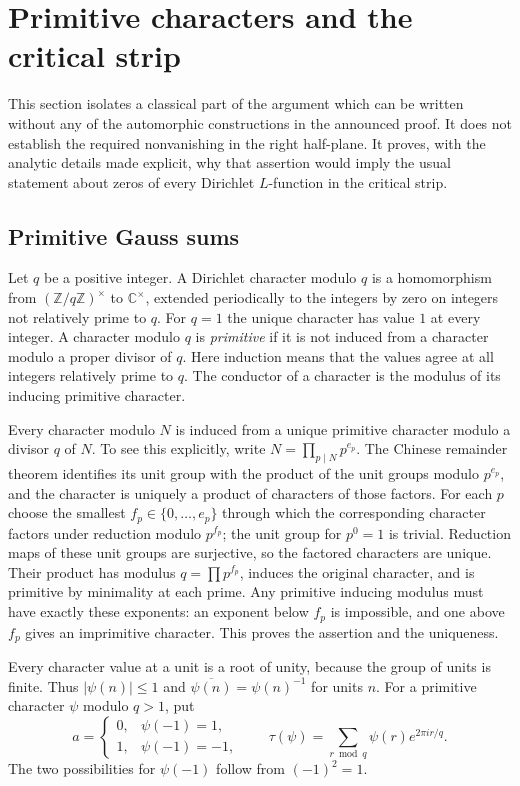 \section{Primitive characters and the critical strip}
\label{sec:primitive-reduction}

This section isolates a classical part of the argument which can be written
without any of the automorphic constructions in the announced proof.  It does
not establish the required nonvanishing in the right half-plane.  It proves,
with the analytic details made explicit, why that assertion would imply the
usual statement about zeros of every Dirichlet $L$-function in the critical
strip.

\subsection{Primitive Gauss sums}

Let $q$ be a positive integer.  A Dirichlet character modulo $q$ is a
homomorphism from $(\mathbb Z/q\mathbb Z)^\times$ to $\mathbb C^\times$,
extended periodically to the integers by zero on integers not relatively
prime to $q$.  For $q=1$ the unique character has value $1$ at every integer.
A character modulo $q$ is \emph{primitive} if it is not induced from a
character modulo a proper divisor of $q$.  Here induction means that the
values agree at all integers relatively prime to $q$.  The conductor of a
character is the modulus of its inducing primitive character.

Every character modulo $N$ is induced from a unique primitive character
modulo a divisor $q$ of $N$.  To see this explicitly, write
$N=\prod_{p\mid N}p^{e_p}$.  The Chinese remainder theorem identifies
its unit group with the product of the unit groups modulo $p^{e_p}$,
and the character is uniquely a product of characters of those factors.
For each $p$ choose the smallest $f_p\in\{0,\ldots,e_p\}$ through which
the corresponding character factors under reduction modulo $p^{f_p}$;
the unit group for $p^0=1$ is trivial.  Reduction maps of these unit groups
are surjective, so the factored characters are unique.  Their product
has modulus $q=\prod p^{f_p}$, induces the original character, and is
primitive by minimality at each prime.  Any primitive inducing modulus
must have exactly these exponents: an exponent below $f_p$ is impossible,
and one above $f_p$ gives an imprimitive character.  This proves the
assertion and the uniqueness.

Every character value at a unit is a root of unity, because the group of
units is finite.  Thus $|\psi(n)|\leq 1$ and
$\overline{\psi(n)}=\psi(n)^{-1}$ for units $n$.
For a primitive character $\psi$ modulo $q>1$, put
\[
 a=\begin{cases}0,&\psi(-1)=1,\\1,&\psi(-1)=-1,\end{cases}
 \qquad
 \tau(\psi)=\sum_{r\bmod q}\psi(r)e^{2\pi i r/q}.
\]
The two possibilities for $\psi(-1)$ follow from $(-1)^2=1$.

